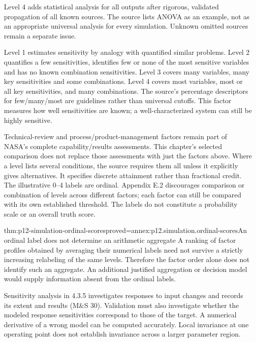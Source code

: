 \begin{description}
Level 4 adds statistical analysis for all outputs after rigorous,
validated propagation of all known sources. The source lists ANOVA
as an example, not as an appropriate universal analysis for every
simulation. Unknown omitted sources remain a separate issue.
\item[Results robustness (Table 18).]
Level 1 estimates sensitivity by analogy with quantified similar
problems. Level 2 quantifies a few sensitivities, identifies few or
none of the most sensitive variables and has no known combination
sensitivities. Level 3 covers many variables, many key sensitivities
and some combinations. Level 4 covers most variables, most or all
key sensitivities, and many combinations. The source's percentage
descriptors for few/many/most are guidelines rather than universal
cutoffs. This factor measures how well sensitivities are known;
a well-characterized system can still be highly sensitive.
\end{description}

Technical-review and process/product-management factors remain part
of NASA's complete capability/results assessments. This chapter's
selected comparison does not replace those assessments with just
the factors above. Where a level lists several conditions, the
source requires them all unless it explicitly gives alternatives.
It specifies discrete attainment rather than fractional credit.
The illustrative 0--4 labels are ordinal. Appendix E.2 discourages
comparison or combination of levels across different factors;
each factor can still be compared with its own established threshold.
The labels do not constitute a probability scale or an overall truth score.

\begin{hbtheorem}{thm:p12-simulation-ordinal-scores}{proved=annex:p12.simulation.ordinal-scores}{An ordinal label does not determine an arithmetic aggregate}
A ranking of factor profiles obtained by averaging their numerical
labels need not survive a strictly increasing relabeling of the
same levels. Therefore the factor order alone does not identify
such an aggregate. An additional justified aggregation or decision
model would supply information absent from the ordinal labels.
\end{hbtheorem}

Sensitivity analysis in 4.3.5 investigates responses to input changes
and records its extent and results (M\&S 30). Validation must also
investigate whether the modeled response sensitivities correspond
to those of the target. A numerical derivative of a wrong model
can be computed accurately. Local invariance at one operating point
does not establish invariance across a larger parameter region.
\cite[Section 4.3.5 and Appendix E.4.5]{NASA7009B2024}

